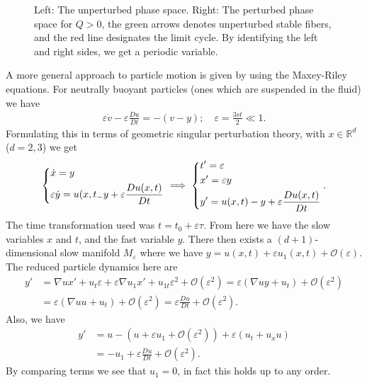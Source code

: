 \begin{ex}
\begin{figure}[h!]
	\caption{Left: The unperturbed phase space. Right: The perturbed phase space for $Q>0$, the green arrows denotes unperturbed stable fibers, and the red line designates the limit cycle. By identifying the left and right sides, we get a periodic variable.}
	\label{fig:clustering_Qpos}
\end{figure}

A more general approach to particle motion is given by \cite{Sapsis2008} using the Maxey-Riley equations. For neutrally buoyant particles (ones which are suspended in the fluid) we have
\begin{align}
	\varepsilon \dot{v} - \varepsilon \frac{Du}{Dt} = -(v-y);\quad \varepsilon = \frac{3st}{2}\ll 1. \label{eq9:maxeyriley}	
\end{align}
Formulating this in terms of geometric singular perturbation theory, with $x \in \mathbb{R}^{d}$ ($d=2,3$) we get
\begin{align}
	\begin{dcases}
		\dot{x} = y\\
		\varepsilon \dot{y} = u(x,t_ - y + \varepsilon \frac{Du(x,t)}{Dt}	
	\end{dcases}
\implies
\begin{dcases}
	t' = \varepsilon \\
	x' = \varepsilon y \\
	y' = u(x,t) - y + \varepsilon \frac{Du(x,t)}{Dt}
\end{dcases}
.
\end{align}
The time transformation used was $t = t_0 + \varepsilon \tau$. From here we have the slow variables $x$ and $t$, and the fast variable $y$. There then exists a $(d+1)$-dimensional slow manifold $M_\varepsilon$ where we have $y = u(x,t) + \varepsilon u_1(x,t) + \mathcal{O}(\varepsilon)$. The reduced particle dynamics here are
\begin{align}
	y' &= \nabla u x' + u_t \varepsilon + \varepsilon \nabla u_1 x' + u_{1t}\varepsilon^{2} + \mathcal{O}(\varepsilon^{2}) 
	= \varepsilon(\nabla uy + u_{t}) + \mathcal{O}(\varepsilon^{2}) \\
	   &= \varepsilon (\nabla u u + u_{t}) + \mathcal{O}(\varepsilon^{2}) 
	   = \varepsilon \frac{Du}{Dt} + \mathcal{O}(\varepsilon^{2}).
\end{align}
Also, we have 
\begin{align}
	y' &= u - \left( u + \varepsilon u_{1} + \mathcal{O}(\varepsilon^{2}) \right) + \varepsilon \left( u_{t} + u_{x}u \right) \\
	   &=-u_{1} + \varepsilon \frac{Du}{Dt} + \mathcal{O}(\varepsilon^{2}).
\end{align}
By  comparing terms we see that $u_{1} =0$, in fact this holds up to any order. 


\end{ex}
